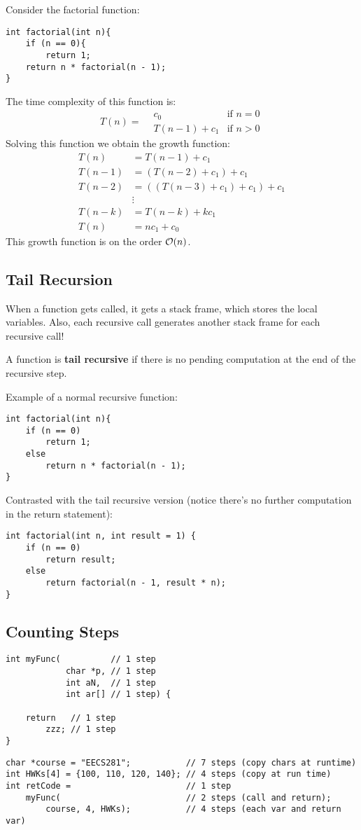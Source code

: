 Consider the factorial function:
\begin{lstlisting}[style=C++]
int factorial(int n){
	if (n == 0){
		return 1;
	return n * factorial(n - 1);
}
\end{lstlisting}
The time complexity of this function is:
$$T(n)=\begin{aligned}
	&c_0 &\text{if } n=0\\
	&T(n-1)+c_1 &\text{if } n>0
\end{aligned}$$
Solving this function we obtain the growth function:
$$\begin{aligned}
	T(n) &= T(n-1)+c_1\\
	T(n-1) &= (T(n-2) + c_1)+c_1 \\
	T(n-2) &= ((T(n-3) + c_1) + c_1) + c_1\\
	&\vdots \\
	T(n-k) &= T(n-k) + kc_1\\
	T(n) &= nc_1 + c_0
\end{aligned}$$
This growth function is on the order $\mathcal{O}(n)$.

\subsection{Tail Recursion}
When a function gets called, it gets a stack frame, which stores the local variables. Also, each recursive call generates another stack frame for each recursive call!

A function is \textbf{tail recursive} if there is no pending computation at the end of the recursive step.

Example of a normal recursive function:
\begin{lstlisting}[style=C++]
int factorial(int n){
	if (n == 0)
		return 1;
	else
		return n * factorial(n - 1);
}
\end{lstlisting}
Contrasted with the tail recursive version (notice there's no further computation in the return statement):
\begin{lstlisting}[style=C++]
int factorial(int n, int result = 1) {
    if (n == 0)
        return result;
    else
        return factorial(n - 1, result * n);
}
\end{lstlisting}

\subsection{Counting Steps}
\begin{lstlisting}[style=C++]
int myFunc(          // 1 step
            char *p, // 1 step
            int aN,  // 1 step
            int ar[] // 1 step) {

    return   // 1 step
        zzz; // 1 step
}
\end{lstlisting}
\begin{lstlisting}[style=C++]
char *course = "EECS281";           // 7 steps (copy chars at runtime)
int HWKs[4] = {100, 110, 120, 140}; // 4 steps (copy at run time)
int retCode =                       // 1 step
    myFunc(                         // 2 steps (call and return);
        course, 4, HWKs);           // 4 steps (each var and return var)
\end{lstlisting}

